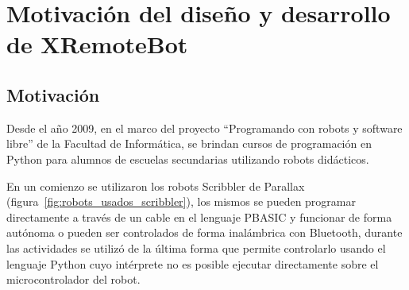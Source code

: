 \chapter{Motivación del diseño y desarrollo de XRemoteBot}\label{ch1}

\section{Motivación}\label{sec:motivacion}
Desde el año 2009, en el marco del proyecto ``Programando con robots y
software libre'' de la Facultad de Informática,
se brindan cursos de programación en Python para alumnos de escuelas
secundarias utilizando robots didácticos.

En un comienzo se utilizaron los robots Scribbler de Parallax
(figura~\ref{fig:robots_usados_scribbler}), los mismos se
pueden programar directamente a través de un cable en el lenguaje
PBASIC y funcionar de forma autónoma o pueden ser controlados de forma
inalámbrica con Bluetooth, durante las actividades se utilizó de la última
forma que permite controlarlo usando el lenguaje Python cuyo intérprete no
es posible ejecutar directamente sobre el microcontrolador del robot.

